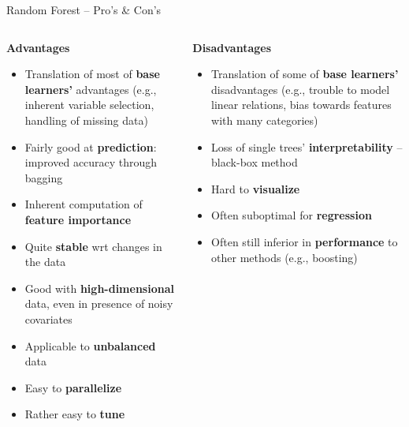 \documentclass[11pt,compress,t,notes=noshow, xcolor=table]{beamer}
\newcommand{\highlight}[1]{\textcolor{highlightcol}{\textbf{#1}}}
\newcommand{\positem}{\item[$\highlight{+}$]}
\newcommand{\negitem}{\item[$\highlight{-}$]}
\begin{document}
\begin{frame}{Random Forest -- Pro's \& Con's}

\footnotesize

\begin{columns}[onlytextwidth]
  \begin{column}{0.5\textwidth}
    \highlight{Advantages}
    \footnotesize
    \begin{itemize}
      \positem Translation of most of \textbf{base learners'} advantages (e.g., 
      inherent variable selection, handling of missing data)
      \positem Fairly good at \textbf{prediction}: improved accuracy through 
      bagging
      \positem Inherent computation of \textbf{feature importance}
      \positem Quite \textbf{stable} wrt changes in the data
      \positem Good with \textbf{high-dimensional} data, even in presence of 
      noisy covariates
      \positem Applicable to \textbf{unbalanced} data
      \positem Easy to \textbf{parallelize}
      \positem Rather easy to \textbf{tune}
    \end{itemize}
  \end{column}
  \begin{column}{0.5\textwidth}
    \highlight{Disadvantages}
    \footnotesize
    \begin{itemize}
      \negitem Translation of some of \textbf{base learners'} disadvantages 
      (e.g., trouble to model linear relations, bias towards features with many 
      categories)
      \negitem Loss of single trees' \textbf{interpretability} -- black-box 
      method
      \negitem Hard to \textbf{visualize}
      \negitem Often suboptimal for \textbf{regression}
      \negitem Often still inferior in \textbf{performance} to other methods 
      (e.g., boosting)
    \end{itemize}
  \end{column}
\end{columns}

\vfill

\small


\end{frame}

\end{document}
